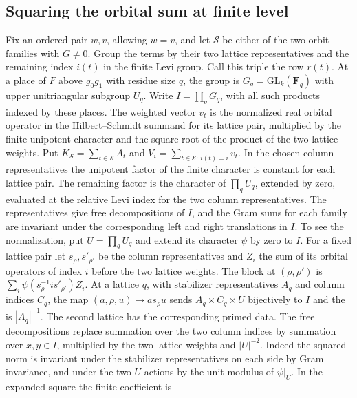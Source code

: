 \subsection{Squaring the orbital sum at finite level}
\leavevmode{}%
Fix an ordered pair \(w,v\), allowing \(w=v\), and let
\(\mathcal S\) be either of the two orbit families with \(G\ne0\).
Group the terms by their two lattice
representatives and the remaining index \(i(t)\) in the finite Levi
group. Call this triple the row \(r(t)\). At a place of \(F\) above
\(g_0g_1\) with residue size \(q\), the group is
\(G_q=\mathrm{GL}_k(\mathbf F_q)\) with upper unitriangular subgroup
\(U_q\). Write \(I=\prod_q G_q\), with all such products indexed by
these places. The weighted vector \(v_t\) is the normalized real
orbital operator in the Hilbert--Schmidt summand for its lattice pair,
multiplied by the finite unipotent character and the square root of
the product of the two lattice weights.
Put \(K_{\mathcal S}=\sum_{t\in\mathcal S}A_t\) and
\(V_i=\sum_{t\in\mathcal S:\,i(t)=i}v_t\).
In the chosen column representatives the unipotent factor of the
finite character is constant for each lattice pair. The remaining
factor is the character of \(\prod_q U_q\), extended by zero, evaluated
at the relative Levi index for the two column representatives. The
representatives give free decompositions of \(I\), and the Gram sums
for each family are invariant under the corresponding left and right
translations in \(I\). To see the normalization, put \(U=\prod_qU_q\)
and extend its character \(\psi\) by zero to \(I\). For a fixed lattice
pair let \(s_\rho,s'_{\rho'}\) be the column representatives and
\(Z_i\) the sum of its orbital operators of index \(i\) before the two
lattice weights. The block at \((\rho,\rho')\) is
\(\sum_i\psi(s_\rho^{-1}i s'_{\rho'})Z_i\).
At a lattice \(q\), with stabilizer representatives \(A_q\) and
column indices \(C_q\), the map
\((a,\rho,u)\mapsto a s_\rho u\) sends \(A_q\times C_q\times U\)
bijectively to \(I\) and the
is \(|A_q|^{-1}\). The second lattice has the corresponding primed data.
The free decompositions replace summation over the two column indices
by summation over \(x,y\in I\), multiplied by the two lattice weights
and \(|U|^{-2}\). Indeed the squared norm is invariant under the
stabilizer representatives on each side by Gram invariance, and under
the two \(U\)-actions by the unit modulus of \(\psi|_U\).
In the expanded square the finite coefficient is
